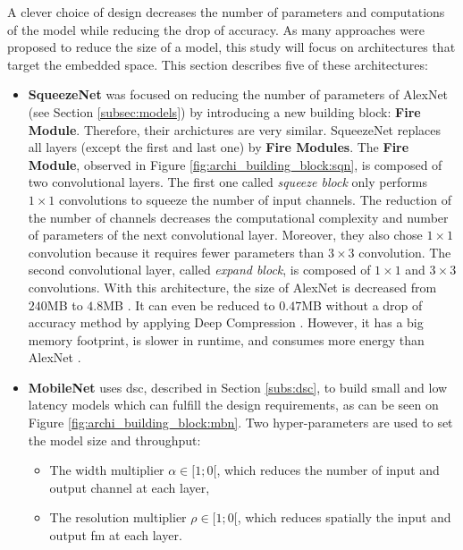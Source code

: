 A clever choice of design decreases the number of parameters and computations of the model while reducing the drop of accuracy. As many approaches were proposed to reduce the size of a model, this study will focus on architectures that target the embedded space. This section describes five of these architectures:
\begin{itemize}
    \item \textbf{SqueezeNet} \cite{iandola_squeezenet_2016} was focused on reducing the number of parameters of AlexNet (see Section \ref{subsec:models}) by introducing a new building block: \textbf{Fire Module}. Therefore, their archictures are very similar. SqueezeNet replaces all layers (except the first and last one) by \textbf{Fire Modules}. The \textbf{Fire Module}, observed in Figure \ref{fig:archi_building_block:sqn}, is composed of two convolutional layers. The first one called \textit{squeeze block} only performs $1 \times 1$ convolutions to squeeze the number of input channels. The reduction of the number of channels decreases the computational complexity and number of parameters of the next convolutional layer. Moreover, they also chose $1 \times 1$ convolution because it requires fewer parameters than $3 \times 3$ convolution.
    The second convolutional layer, called \textit{expand block}, is composed of $1 \times 1$ and $3 \times 3$ convolutions. With this architecture, the size of AlexNet is decreased from $240$MB to $4.8$MB \cite{iandola_squeezenet_2016}. It can even be reduced to $0.47$MB without a drop of accuracy method by applying Deep Compression \cite{han_deep_2016}. However, it has a big memory footprint, is slower in runtime, and consumes more energy than AlexNet \cite{sze_efficient_2017}.
    \item \textbf{MobileNet} \cite{howard_mobilenets_2017} uses \acrshort{dsc}, described in Section \ref{subs:dsc}, to build small and low latency models which can fulfill the design requirements, as can be seen on Figure \ref{fig:archi_building_block:mbn}. Two hyper-parameters are used to set the model size and throughput:
    \begin{itemize}
        \item The width multiplier $\alpha \in [1; 0[$, which reduces the number of input and output channel at each layer,
        \item The resolution multiplier $\rho \in [1; 0[$,  which reduces spatially the input and output \acrshort{fm} at each layer.
    \end{itemize}

\end{itemize}
